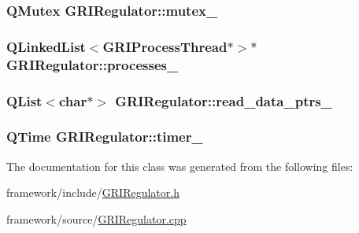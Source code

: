 \hypertarget{classGRIRegulator_a462abd0c2e6a432f9d080cde8899d059}{
\subsubsection[{mutex\-\_\-}]{\setlength{\rightskip}{0pt plus 5cm}\-Q\-Mutex {\bf \-G\-R\-I\-Regulator\-::mutex\-\_\-}}}\label{classGRIRegulator_a462abd0c2e6a432f9d080cde8899d059}
\hypertarget{classGRIRegulator_afbe971d9b6ae796fd8fe9bc8f241ba35}{
\subsubsection[{processes\-\_\-}]{\setlength{\rightskip}{0pt plus 5cm}\-Q\-Linked\-List$<${\bf \-G\-R\-I\-Process\-Thread}$\ast$$>$$\ast$ {\bf \-G\-R\-I\-Regulator\-::processes\-\_\-}}}\label{classGRIRegulator_afbe971d9b6ae796fd8fe9bc8f241ba35}
\hypertarget{classGRIRegulator_acbc03d3e5b17ea2725ac93b313ecb4e3}{
\subsubsection[{read\-\_\-data\-\_\-ptrs\-\_\-}]{\setlength{\rightskip}{0pt plus 5cm}\-Q\-List$<$char$\ast$$>$ {\bf \-G\-R\-I\-Regulator\-::read\-\_\-data\-\_\-ptrs\-\_\-}}}\label{classGRIRegulator_acbc03d3e5b17ea2725ac93b313ecb4e3}
\hypertarget{classGRIRegulator_a43ec993acb8324946780eeab8484e8b4}{
\subsubsection[{timer\-\_\-}]{\setlength{\rightskip}{0pt plus 5cm}\-Q\-Time {\bf \-G\-R\-I\-Regulator\-::timer\-\_\-}}}\label{classGRIRegulator_a43ec993acb8324946780eeab8484e8b4}


\-The documentation for this class was generated from the following files\-:\begin{DoxyCompactItemize}
\item 
framework/include/\hyperlink{GRIRegulator_8h}{\-G\-R\-I\-Regulator.\-h}\item 
framework/source/\hyperlink{GRIRegulator_8cpp}{\-G\-R\-I\-Regulator.\-cpp}\end{DoxyCompactItemize}
